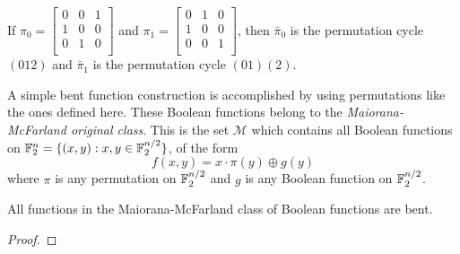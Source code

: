 \begin{example}
  If $\pi_0=\begin{bmatrix}
               0&0&1\\
               1&0&0\\
               0&1&0\\
						 \end{bmatrix}$ and $\pi_1=
             \begin{bmatrix}
               0&1&0\\
               1&0&0\\
               0&0&1\\
					   \end{bmatrix}$, then $\bar{\pi}_0$ is the permutation cycle $(012)$
						 and $\bar{\pi}_1$ is the permutation cycle $(01)(2)$.
\end{example}
\par A simple bent function construction is accomplished by using permutations
like the ones defined here. These Boolean functions belong to the {\it
Maiorana-McFarland original class}. This is the set
$\mathcal{M}$ which contains all Boolean functions on
$\mathbb{F}_2^n=\{(x,y):x,y\in\mathbb{F}_2^{n/2}\}$, of the form
  \[
  f(x,y)=x\cdot\pi(y)\oplus g(y)
  \]
where $\pi$ is any permutation on $\mathbb{F}_2^{n/2}$ and $g$ is any Boolean
function on $\mathbb{F}_2^{n/2}$.

\begin{proposition}{\rm\cite{col:c06}}
\par All functions in the Maiorana-McFarland class of Boolean functions are
bent.
\end{proposition}

\begin{proof}

\end{proof}

